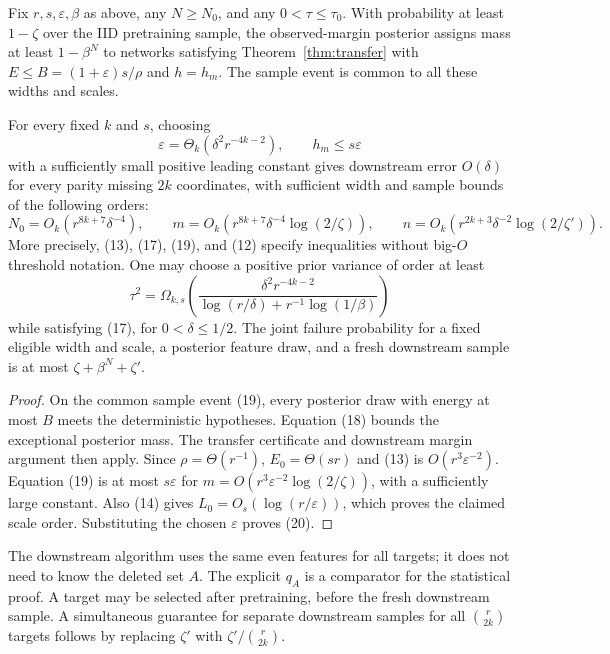 \begin{theorem}
Fix $r,s,\varepsilon,\beta$ as above, any $N\ge N_0$, and any
$0<\tau\le\tau_0$. With probability at least $1-\zeta$ over the IID
pretraining sample, the observed-margin posterior assigns mass at least
$1-\beta^N$ to networks satisfying Theorem~\ref{thm:transfer} with
$E\le B=(1+\varepsilon)s/\rho$ and $h=h_m$.
The sample event is common to all these widths and scales.

For every fixed $k$ and $s$, choosing
\[
 \varepsilon=\Theta_k(\delta^2r^{-4k-2}),\qquad
 h_m\le s\varepsilon
\]
with a sufficiently small positive leading constant gives downstream
error $O(\delta)$ for every parity missing $2k$ coordinates, with sufficient
width and sample bounds of the following orders:
\[
 N_0=O_k(r^{8k+7}\delta^{-4}),\qquad
 m=O_k(r^{8k+7}\delta^{-4}\log(2/\zeta)),\qquad
 n=O_k(r^{2k+3}\delta^{-2}\log(2/\zeta')).
 \tag{20}
\]
More precisely, (13), (17), (19), and (12) specify inequalities without
big-$O$ threshold notation. One may choose a positive prior variance of
order at least
\[
 \tau^2=\Omega_{k,s}\left(
 \frac{\delta^2r^{-4k-2}}
 {\log(r/\delta)+r^{-1}\log(1/\beta)}\right)
\]
while satisfying (17), for $0<\delta\le1/2$.
The joint failure probability for a fixed eligible width and scale,
a posterior feature draw, and a fresh downstream sample is at most
$\zeta+\beta^N+\zeta'$.
\end{theorem}
\begin{proof}
On the common sample event (19), every posterior draw with energy at
most $B$ meets the deterministic hypotheses. Equation (18) bounds the
exceptional posterior mass. The transfer certificate and downstream
margin argument then apply. Since $\rho=\Theta(r^{-1})$,
$E_0=\Theta(s r)$ and (13) is $O(r^3\varepsilon^{-2})$.
Equation (19) is at most $s\varepsilon$ for
$m=O(r^3\varepsilon^{-2}\log(2/\zeta))$, with a sufficiently large
constant. Also (14) gives
$L_0=O_s(\log(r/\varepsilon))$, which proves the claimed scale order.
Substituting the chosen $\varepsilon$ proves (20).
\end{proof}

The downstream algorithm uses the same even features for all targets;
it does not need to know the deleted set $A$. The explicit $q_A$ is a
comparator for the statistical proof. A target may be selected after
pretraining, before the fresh downstream sample. A simultaneous guarantee
for separate downstream samples for all $\binom r{2k}$ targets follows
by replacing $\zeta'$ with $\zeta'/\binom r{2k}$.
